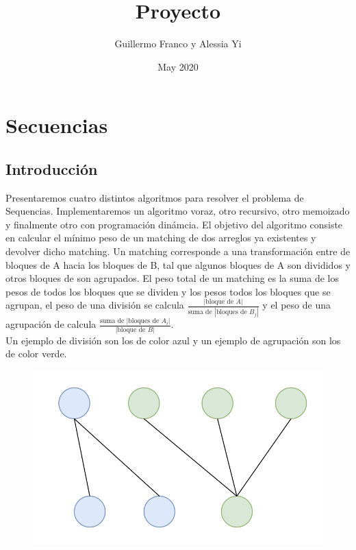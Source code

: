 \documentclass[12pt]{article}
\title{Proyecto}
\author{Guillermo Franco y Alessia Yi }
\date{May 2020}
\begin{document}
\maketitle

\section{Secuencias}
\subsection*{Introducción}
Presentaremos cuatro distintos algoritmos para resolver el problema de Sequencias. Implementaremos un algoritmo voraz, otro recursivo, otro memoizado y finalmente otro con programación dinámcia. El objetivo del algoritmo consiste en calcular el mínimo peso de un matching de dos arreglos ya existentes y devolver dicho matching. Un matching corresponde a una transformación entre de bloques de A hacia los bloques de B, tal que algunos bloques de A son divididos y otros bloques de son agrupados. El peso total de un matching es la suma de los pesos de todos los bloques que se dividen y los pesos todos los bloques que se agrupan, el peso de una división se calcula $\frac{|\text{bloque de }A|}{\text{suma de }|\text{bloques de }B_j|}$ y el peso de una agrupación de calcula $\frac{\text{suma de }|\text{bloques de }A_i|}{|\text{bloque de }B|}$.\\




Un ejemplo de división son los de color azul y un ejemplo de agrupación son los de color verde.
\begin{figure}[h]
\includegraphics[scale=0.7]{matching.png}
\centering
\end{figure}
\end{document}
